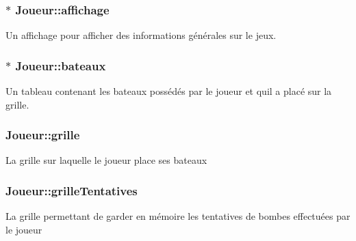\subsubsection[{\texorpdfstring{affichage}{affichage}}]{$\ast$ Joueur\+::affichage\hspace{0.3cm}{\ttfamily [protected]}}\hypertarget{class_joueur_a388634e5c242146dad447bc04756bab5}{}\label{class_joueur_a388634e5c242146dad447bc04756bab5}
Un affichage pour afficher des informations générales sur le jeux. 
\subsubsection[{\texorpdfstring{bateaux}{bateaux}}]{$\ast$ Joueur\+::bateaux\hspace{0.3cm}{\ttfamily [protected]}}\hypertarget{class_joueur_acf537ce482b493555318da7da14d8ac9}{}\label{class_joueur_acf537ce482b493555318da7da14d8ac9}
Un tableau contenant les bateaux possédés par le joueur et qu\textquotesingle{}il a placé sur la grille. 
\subsubsection[{\texorpdfstring{grille}{grille}}]{ Joueur\+::grille\hspace{0.3cm}{\ttfamily [protected]}}\hypertarget{class_joueur_a97a052f0b9966c94c49862df3144a62f}{}\label{class_joueur_a97a052f0b9966c94c49862df3144a62f}
La grille sur laquelle le joueur place ses bateaux 
\subsubsection[{\texorpdfstring{grille\+Tentatives}{grilleTentatives}}]{ Joueur\+::grille\+Tentatives\hspace{0.3cm}{\ttfamily [protected]}}\hypertarget{class_joueur_abbef5ee9c9c05a24ffa2c462e14cdfd7}{}\label{class_joueur_abbef5ee9c9c05a24ffa2c462e14cdfd7}
La grille permettant de garder en mémoire les tentatives de bombes effectuées par le joueur 

